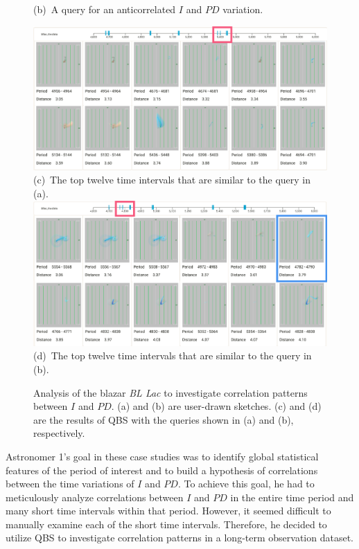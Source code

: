 \begin{figure}[tb]
\begin{minipage}{0.49\linewidth}
        \footnotesize{\sf(b)~A query for an anticorrelated $I$ and $PD$ variation.}\\
    \end{minipage}
    \includegraphics[width=.99\linewidth]{vgtc_journal_latex/figures/correlateResultsLabel14.png}\\
    \footnotesize{\sf(c)~The top twelve time intervals that are similar to the query in (a).}\\
    \includegraphics[width=.99\linewidth]{vgtc_journal_latex/figures/anticorrelateResultsLabel14.png}\\
    \footnotesize{\sf(d)~The top twelve time intervals that are similar to the query in (b).}
    \caption{Analysis of the blazar \emph{BL Lac} to investigate correlation patterns between $I$ and $PD$. (a) and (b) are user-drawn sketches. (c) and (d) are the results of QBS with the queries shown in (a) and (b), respectively.}
    \label{fig:EvaluationQueryResults}
\end{figure}
%
Astronomer 1's goal in these case studies was to identify global statistical features of the period of interest and to build a hypothesis of correlations between the time variations of $I$ and $PD$.
To achieve this goal, he had to meticulously analyze correlations between $I$ and $PD$ in the entire time period and many short time intervals within that period.
However, it seemed difficult to manually examine each of the short time intervals.
Therefore, he decided to utilize QBS to investigate correlation patterns in a long-term observation dataset.

